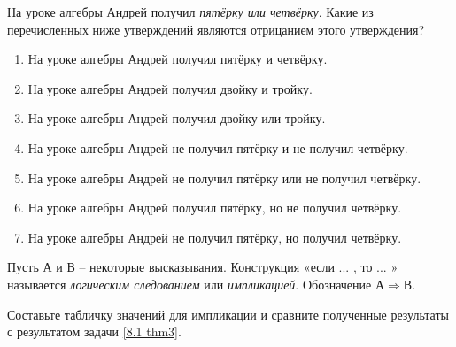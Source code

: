 \begin{thm}
    На уроке алгебры Андрей получил \textit{пятёрку или четвёрку}. Какие из перечисленных ниже утверждений являются отрицанием этого утверждения?
    \begin{enumerate}[label=\asbuk*), ref=\asbuk*]
        \item На уроке алгебры Андрей получил пятёрку и четвёрку.
        \item На уроке алгебры Андрей получил двойку и тройку.
        \item На уроке алгебры Андрей получил двойку или тройку.
        \item На уроке алгебры Андрей не получил пятёрку и не получил четвёрку.
        \item На уроке алгебры Андрей не получил пятёрку или не получил четвёрку.
        \item На уроке алгебры Андрей получил пятёрку, но не получил четвёрку.
        \item На уроке алгебры Андрей не получил пятёрку, но получил четвёрку.
    \end{enumerate}
\end{thm}

\begin{dfn}
    Пусть $А$ и $В$ – некоторые высказывания. Конструкция «если ... , то ... » называется \textit{логическим следованием} или \textit{импликацией}. Обозначение $А \Rightarrow В$.
\end{dfn}

\begin{ex}
    Составьте табличку значений для импликации и сравните полученные результаты с результатом задачи \ref{8.1 thm3}.
\end{ex}